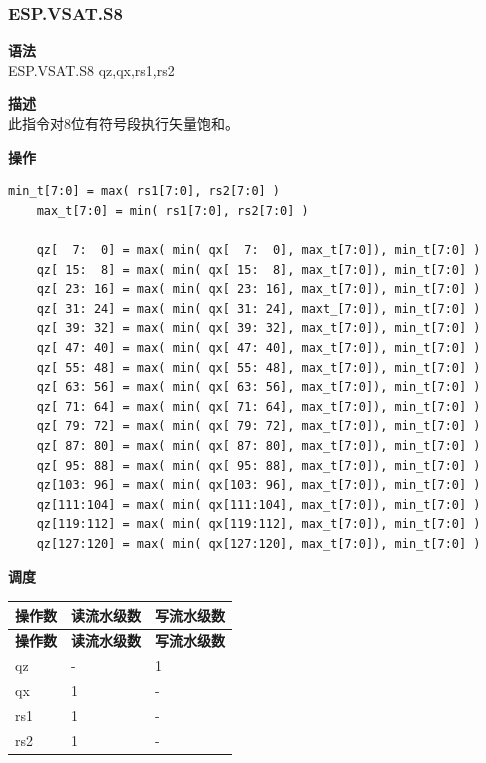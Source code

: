 \newpage
\subsubsection{ESP.VSAT.S8}\label{instruction:ESPVSATS8}
\textbf{语法}\\
ESP.VSAT.S8 qz,qx,rs1,rs2

\textbf{描述}\\
此指令对8位有符号段执行矢量饱和。

\textbf{操作}\\
\begin{lstlisting}[escapeinside=`?]
    min_t[7:0] = max( rs1[7:0], rs2[7:0] )
    max_t[7:0] = min( rs1[7:0], rs2[7:0] )

    qz[  7:  0] = max( min( qx[  7:  0], max_t[7:0]), min_t[7:0] )
    qz[ 15:  8] = max( min( qx[ 15:  8], max_t[7:0]), min_t[7:0] )
    qz[ 23: 16] = max( min( qx[ 23: 16], max_t[7:0]), min_t[7:0] )
    qz[ 31: 24] = max( min( qx[ 31: 24], maxt_[7:0]), min_t[7:0] )
    qz[ 39: 32] = max( min( qx[ 39: 32], max_t[7:0]), min_t[7:0] )
    qz[ 47: 40] = max( min( qx[ 47: 40], max_t[7:0]), min_t[7:0] )
    qz[ 55: 48] = max( min( qx[ 55: 48], max_t[7:0]), min_t[7:0] )
    qz[ 63: 56] = max( min( qx[ 63: 56], max_t[7:0]), min_t[7:0] )
    qz[ 71: 64] = max( min( qx[ 71: 64], max_t[7:0]), min_t[7:0] )
    qz[ 79: 72] = max( min( qx[ 79: 72], max_t[7:0]), min_t[7:0] )
    qz[ 87: 80] = max( min( qx[ 87: 80], max_t[7:0]), min_t[7:0] )
    qz[ 95: 88] = max( min( qx[ 95: 88], max_t[7:0]), min_t[7:0] )
    qz[103: 96] = max( min( qx[103: 96], max_t[7:0]), min_t[7:0] )
    qz[111:104] = max( min( qx[111:104], max_t[7:0]), min_t[7:0] )
    qz[119:112] = max( min( qx[119:112], max_t[7:0]), min_t[7:0] )
    qz[127:120] = max( min( qx[127:120], max_t[7:0]), min_t[7:0] )
\end{lstlisting}

\textbf{调度}\\
\begin{longtable}[c]{|l|l|l|}
    \hline
    \rowcolor{lightgray}
    \textbf{操作数} & \textbf{读流水级数} & \textbf{写流水级数} \\\hline
    \endfirsthead
    \hline
    \rowcolor{lightgray}
     \textbf{操作数} & \textbf{读流水级数} & \textbf{写流水级数} \\\hline
    \endhead
    \hline
    \endfoot

  qz & - & 1 \\\hline
    qx & 1 & - \\\hline
    rs1 & 1 & - \\\hline
    rs2 & 1 & -

\end{longtable}


